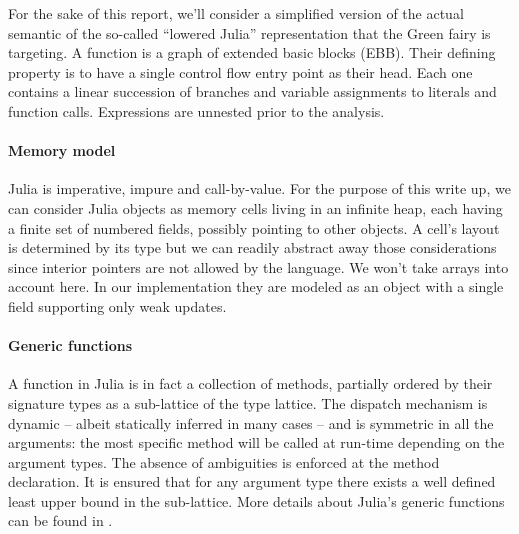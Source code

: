 \documentclass[11pt]{article}
\begin{document}
For the sake of this report, we'll consider a simplified version of the actual semantic of the so-called ``lowered Julia'' representation that the Green fairy is targeting. 
A function is a graph of extended basic blocks (EBB). Their defining property is to have a single control flow entry point as their head. Each one contains a linear succession of branches and variable assignments to literals and function calls.
Expressions are unnested prior to the analysis.

\paragraph{Memory model} Julia is imperative, impure and call-by-value.
For the purpose of this write up, we can consider Julia objects as memory cells living in an infinite heap, each having a finite set of numbered fields, possibly pointing to other objects.
A cell's layout is determined by its type but we can readily abstract away those considerations since interior pointers are not allowed by the language.
We won't take arrays into account here. In our implementation they are modeled as an object with a single field supporting only weak updates.


\paragraph{Generic functions} A function in Julia is in fact a collection of methods, partially ordered by their signature types as a sub-lattice of the type lattice.
The dispatch mechanism is dynamic -- albeit statically inferred in many cases -- and is symmetric in all the arguments: the most specific method will be called at run-time depending on the argument types.
The absence of ambiguities is enforced at the method declaration.
It is ensured that for any argument type there exists a well defined least upper bound in the sub-lattice.
More details about Julia's generic functions can be found in \cite{julia-paper,jeff-phd}.
\end{document}
